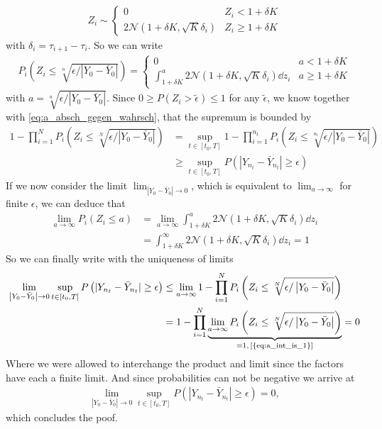 \begin{align}
Z_i \sim \begin{cases} 
      0 & Z_i< 1+\delta K \\
      2 \mathcal{N}(1+\delta K,\sqrt{K} \delta_i) &  Z_i\geq 1+\delta K
   \end{cases}
\end{align}
with $\delta_i = \tau_{i+1}-\tau_i$. So we can write
\begin{align}
P_i\left(Z_i\leq \sqrt[n]{ \epsilon/\left|Y_0-\bar{Y}_0\right|}\right) =
 \begin{cases} 
      0 & a< 1+\delta K \\
      \int_{1+\delta K}^{a} 2 \mathcal{N}(1+\delta K,\sqrt{K} \delta_i) \dd z_i & a\geq 1+\delta K
   \end{cases}
\end{align}
with $a=\sqrt[n]{\epsilon/\left|Y_0-\bar{Y}_0\right| }$.
Since $0\geq P(Z_i>\tilde{\epsilon})\leq 1$ for any $\tilde{\epsilon}$, we know together with \cref{eq:a_absch_gegen_wahrsch}, that the supremum is bounded by
\begin{align}
1 - \prod_{i=1}^N P_i\left(Z_i\leq \sqrt[N]{ \epsilon/\left|Y_0-\bar{Y}_0\right|}\right) &= \sup_{t\in[t_0,T]}  1 - \prod_{i=1}^{n_t} P_i\left(Z_i\leq \sqrt[n_t]{ \epsilon/\left|Y_0-\bar{Y}_0\right|}\right) \\ &\geq\sup_{t\in[t_0,T]} P\left(|Y_{n_t}-\bar{Y}_{n_t}|\geq \epsilon\right)
\end{align}
If we now consider the limit $\lim_{\left|Y_0-\bar{Y}_0\right| \rightarrow 0}$, which is equivalent to $\lim_{a\rightarrow \infty}$ for finite $\epsilon$, we can deduce that
\begin{align}
\lim_{a\rightarrow \infty} P_i(Z_i\leq a) &= \lim_{a\rightarrow \infty} \int_{1+\delta K}^{a} 2\mathcal{N}(1+\delta K,\sqrt{K}\delta_i)\dd z_i \\
&= \int_{1+\delta K}^{\infty} 2\mathcal{N}(1+\delta K,\sqrt{K}\delta_i)\dd z_i =1\label{eq:a_int_is_1}
\end{align}
So we can finally write with the uniqueness of limits
\begin{align}
\lim_{\left|Y_0-\bar{Y}_0\right| \rightarrow 0} \sup_{t\in[t_0,T]} P\left(|Y_{n_t}-\bar{Y}_{n_t}|\geq \epsilon\right) &\leq \lim_{a\rightarrow \infty} 1 -  \prod_{i=1}^N P_i\left(Z_i\leq \sqrt[N]{ \epsilon/\left|Y_0-\bar{Y}_0\right|}\right)\\
&=1 -  \prod_{i=1}^N \underbrace{\lim_{a\rightarrow \infty} P_i\left(Z_i\leq \sqrt[N]{ \epsilon/\left|Y_0-\bar{Y}_0\right|}\right)}_{=1,\,\text{\cref{{eq:a_int_is_1}}}} = 0
\end{align}
Where we were allowed to interchange the product and limit since the factors have each a finite limit.
And since probabilities can not be negative we arrive at
\begin{align}
\lim_{\left|Y_0-\bar{Y}_0\right| \rightarrow 0} \sup_{t\in[t_0,T]} P\left(|Y_{n_t}-\bar{Y}_{n_t}|\geq \epsilon\right) = 0,
\end{align}
which concludes the poof.